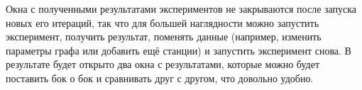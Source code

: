 \documentclass{article}
\begin{document}
    Окна с полученными результатами экспериментов не закрываются после запуска новых его итераций, так что для большей наглядности можно запустить эксперимент, получить результат, поменять данные (например, изменить параметры графа или добавить ещё станции) и запустить эксперимент снова. В результате будет открыто два окна с результатами, которые можно будет поставить бок о бок и сравнивать друг с другом, что довольно удобно. 
\end{document}
